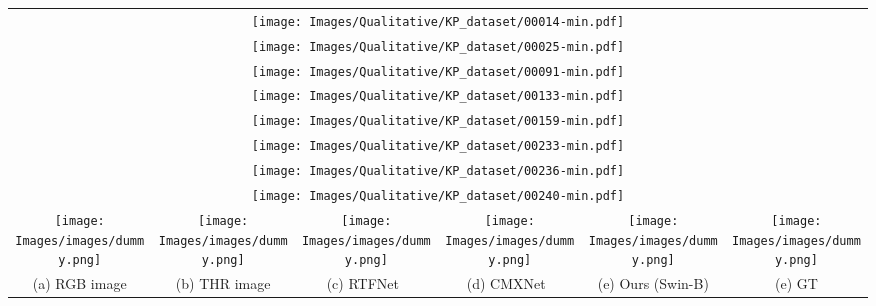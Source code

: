 \documentclass[10pt,twocolumn,letterpaper]{article}
\begin{document}
\begin{figure*}[t]
\begin{center}
{
\begin{tabular}{c@{\hskip 0.005\linewidth}c@{\hskip 0.005\linewidth}c@{\hskip 0.005\linewidth}c@{\hskip 0.005\linewidth}c@{\hskip 0.005\linewidth}c}
\multicolumn{6}{c}{\texttt{[image: Images/Qualitative/KP\_dataset/00014-min.pdf]}} \vspace{-0.02in} \\
\multicolumn{6}{c}{\texttt{[image: Images/Qualitative/KP\_dataset/00025-min.pdf]}} \vspace{-0.02in} \\
\multicolumn{6}{c}{\texttt{[image: Images/Qualitative/KP\_dataset/00091-min.pdf]}} \vspace{-0.02in} \\
\multicolumn{6}{c}{\texttt{[image: Images/Qualitative/KP\_dataset/00133-min.pdf]}} \vspace{-0.02in} \\
\multicolumn{6}{c}{\texttt{[image: Images/Qualitative/KP\_dataset/00159-min.pdf]}} \vspace{-0.02in} \\
\multicolumn{6}{c}{\texttt{[image: Images/Qualitative/KP\_dataset/00233-min.pdf]}} \vspace{-0.02in} \\
\multicolumn{6}{c}{\texttt{[image: Images/Qualitative/KP\_dataset/00236-min.pdf]}} \vspace{-0.02in} \\
\multicolumn{6}{c}{\texttt{[image: Images/Qualitative/KP\_dataset/00240-min.pdf]}} \vspace{-0.02in} \\
\texttt{[image: Images/images/dummy.png]} & \texttt{[image: Images/images/dummy.png]} & 
\texttt{[image: Images/images/dummy.png]} & \texttt{[image: Images/images/dummy.png]} & 
\texttt{[image: Images/images/dummy.png]} & \texttt{[image: Images/images/dummy.png]} \vspace{-0.1in} \\ 
{\footnotesize (a) RGB image} & {\footnotesize (b) THR image} & {\footnotesize (c) RTFNet~\cite{sun2019rtfnet} } & {\footnotesize (d) CMXNet~\cite{liu2022cmx}} &  {\footnotesize (e) Ours (Swin-B)} &  {\footnotesize (e) GT}  \\ 
\end{tabular}
}
\end{center}
\vspace{-0.2in}
\caption{{\bf Qualitative comparison for semantic segmentation of RGB-T images on KP~\cite{hwang2015multispectral} dataset.}}
\label{fig:supple_kp}
\vspace{-0.2in}
\end{figure*}
 

 
\end{document}
